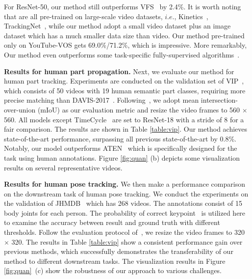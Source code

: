\documentclass{article}
\begin{document}
For ResNet-50, our method still outperforms VFS~\cite{xu2021rethinking} by 2.4\%. It is worth noting that \cite{jabri2020space}\cite{li2019joint}\cite{wang2020contrastive}\cite{xu2021rethinking}\cite{zhao2021modelling} are all pre-trained on large-scale video datasets, $i.e.$, Kinetics~\cite{carreira2017quo}, TrackingNet~\cite{muller2018trackingnet}, while our method adopt a small video dataset plus an image dataset which has a much smaller data size than video.  Our method pre-trained only on YouTube-VOS gets 69.0\%/71.2\%, which is impressive.  More remarkably, Our method even outperforms some task-specific fully-supervised algorithms~\cite{maninis2018video}\cite{voigtlaender2017online}\cite{voigtlaender2019feelvos}.



\textbf{Results for human part propagation.} Next, we evaluate our method for human part tracking. Experiments are conducted on the validation set of VIP~\cite{zhou2018adaptive}, which consists of 50 videos with 19 human semantic part classes, requiring more precise matching than DAVIS-2017~\cite{pont20172017}. Following~\cite{zhou2018adaptive}, we adopt mean intersection-over-union (mIoU) as our evaluation metric and resize the video frames to 560 $\times$ 560. All models except TimeCycle~\cite{wang2019learning} are set to ResNet-18 with a stride of 8 for a fair comparison. The results are shown in Table \ref{table:vip}. Our method achieves state-of-the-art performance, surpassing all previous state-of-the-art by 0.8\%. Notably, our model outperforms ATEN~\cite{zhou2018adaptive} which is specifically designed for the task using human annotations. Figure \ref{fig:quan} (b) depicts some visualization results on several representative videos.


\textbf{Results for human pose tracking.} We then make a performance comparison on the downstream task of human pose tracking. We conduct the experiments on the validation of JHMDB~\cite{jhuang2013towards} which has 268 videos. The annotations consist of 15 body joints for each person. The probability of correct keypoint~\cite{yang2012articulated} is utilized here to examine the accuracy between result and ground truth with different thresholds. Follow the evaluation protocol of~\cite{jabri2020space}\cite{li2019joint}, we resize the video frames to 320 $\times$ 320. The results in Table \ref{table:vip} show a consistent performance gain over previous methods, which successfully demonstrates the transferability of our method to different downstream tasks. The visualization results in Figure \ref{fig:quan}~(c) show the robustness of our approach to various challenges.
\end{document}
